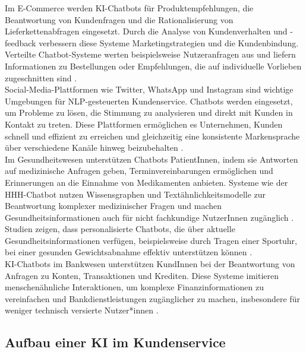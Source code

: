 \documentclass[12pt]{article}
\begin{document}
Im E-Commerce werden KI-Chatbots für Produktempfehlungen, die Beantwortung von Kundenfragen und die Rationalisierung von Lieferkettenabfragen eingesetzt. Durch die Analyse von Kundenverhalten und -feedback verbessern diese Systeme Marketingstrategien und die Kundenbindung. Verteilte Chatbot-Systeme werten beispielsweise Nutzeranfragen aus und liefern Informationen zu Bestellungen oder Empfehlungen, die auf individuelle Vorlieben zugeschnitten sind \cite{lin_sentiment_2020, angelov_e-commerce_2019}.\\

Social-Media-Plattformen wie Twitter, WhatsApp und Instagram sind wichtige Umgebungen für NLP-gesteuerten Kundenservice. Chatbots werden eingesetzt, um Probleme zu lösen, die Stimmung zu analysieren und direkt mit Kunden in Kontakt zu treten. Diese Plattformen ermöglichen es Unternehmen, Kunden schnell und effizient zu erreichen und gleichzeitig eine konsistente Markensprache über verschiedene Kanäle hinweg beizubehalten \cite{oraby_how_2017, liu_towards_2020, panda_conceptual_2024}.\\

Im Gesundheitswesen unterstützen Chatbots PatientInnen, indem sie Antworten auf medizinische Anfragen geben, Terminvereinbarungen ermöglichen und Erinnerungen an die Einnahme von Medikamenten anbieten. Systeme wie der HHH-Chatbot nutzen Wissensgraphen und Textähnlichkeitsmodelle zur Beantwortung komplexer medizinischer Fragen und machen Gesundheitsinformationen auch für nicht fachkundige NutzerInnen zugänglich \cite{bao_hhh_2020}. Studien zeigen, dass personalisierte Chatbots, die über aktuelle Gesundheitsinformationen verfügen, beispielsweise durch Tragen einer Sportuhr, bei einer gesunden Gewichtsabnahme effektiv unterstützen können \cite{chew_use_2022, huang_chatbot-supported_2018, chew_potential_2021}.\\

KI-Chatbots im Bankwesen unterstützen KundInnen bei der Beantwortung von Anfragen zu Konten, Transaktionen und Krediten. Diese Systeme imitieren menschenähnliche Interaktionen, um komplexe Finanzinformationen zu vereinfachen und Bankdienstleistungen zugänglicher zu machen, insbesondere für weniger technisch versierte Nutzer*innen \cite{eneizan_artificial_2022, alt_banking_2021, nguyen_determinants_2021}.\\


\subsection{Aufbau einer KI im Kundenservice}
\end{document}
